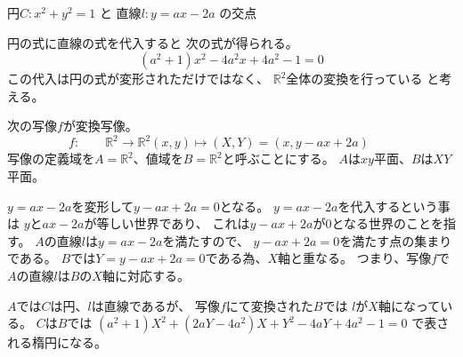\documentclass[10pt,b5paper]{ltjsarticle}
\begin{document}
円$C: x^2+y^2=1$
と
直線$l:y=ax-2a$
の交点

円の式に直線の式を代入すると
次の式が得られる。
\begin{equation}
 (a^2+1)x^2-4a^2x+4a^2-1=0
\end{equation}
この代入は円の式が変形されただけではなく、
$\mathbb{R}^2$全体の変換を行っている
と考える。

次の写像$f$が変換写像。
\begin{equation}
 f: \qquad \mathbb{R}^2 \rightarrow \mathbb{R}^2
 (x,y) \mapsto (X,Y)=(x,y-ax+2a)
  \qquad
\end{equation}
写像の定義域を$A=\mathbb{R}^2$、値域を$B=\mathbb{R}^2$と呼ぶことにする。
$A$は$xy$平面、$B$は$XY$平面。

$y=ax-2a$を変形して$y-ax+2a=0$となる。
$y=ax-2a$を代入するという事は
$y$と$ax-2a$が等しい世界であり、
これは$y-ax+2a$が$0$となる世界のことを指す。
$A$の直線$l$は$y=ax-2a$を満たすので、
$y-ax+2a=0$を満たす点の集まりである。
$B$では$Y=y-ax+2a=0$である為、$X$軸と重なる。
つまり、写像$f$で$A$の直線$l$は$B$の$X$軸に対応する。

$A$では$C$は円、$l$は直線であるが、
写像$f$にて変換された$B$では
$l$が$X$軸になっている。
$C$は$B$では
$(a^2+1)X^2+(2aY-4a^2)X+Y^2-4aY+4a^2-1=0$
で表される楕円になる。


\hrulefill
\end{document}
